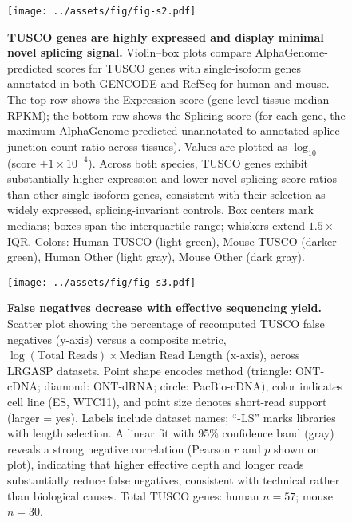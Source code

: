 {  \begin{figure}[htbp]
      \centering
      \texttt{[image: ../assets/fig/fig-s2.pdf]}
      \caption{\textbf{TUSCO genes are highly expressed and display minimal novel splicing signal.} Violin--box plots compare AlphaGenome-predicted scores for TUSCO genes with single-isoform genes annotated in both GENCODE and RefSeq for human and mouse. The top row shows the Expression score (gene-level tissue-median RPKM); the bottom row shows the Splicing score (for each gene, the maximum AlphaGenome-predicted unannotated-to-annotated splice-junction count ratio across tissues). Values are plotted as $\log_{10}$ (score $+ 1 \times 10^{-4}$). Across both species, TUSCO genes exhibit substantially higher expression and lower novel splicing score ratios than other single-isoform genes, consistent with their selection as widely expressed, splicing-invariant controls. Box centers mark medians; boxes span the interquartile range; whiskers extend $1.5 \times$ IQR. Colors: Human TUSCO (light green), Mouse TUSCO (darker green), Human Other (light gray), Mouse Other (dark gray).}
      \label{fig:s2}
  \end{figure}

  \clearpage

  \begin{figure}[htbp]
      \centering
      \texttt{[image: ../assets/fig/fig-s3.pdf]}
      \caption{\textbf{False negatives decrease with effective sequencing yield.} Scatter plot showing the percentage of recomputed TUSCO false negatives (y-axis) versus a composite metric, $\log(\text{Total Reads}) \times \text{Median Read Length}$ (x-axis), across LRGASP datasets. Point shape encodes method (triangle: ONT-cDNA; diamond: ONT-dRNA; circle: PacBio-cDNA), color indicates cell line (ES, WTC11), and point size denotes short-read support (larger = yes). Labels include dataset names; ``-LS'' marks libraries with length selection. A linear fit with 95\% confidence band (gray) reveals a strong negative correlation (Pearson $r$ and $p$ shown on plot), indicating that higher effective depth and longer reads substantially reduce false negatives, consistent with technical rather than biological causes. Total TUSCO genes: human $n=57$; mouse $n=30$.}
      \label{fig:s3}
  \end{figure}

  \clearpage

}
